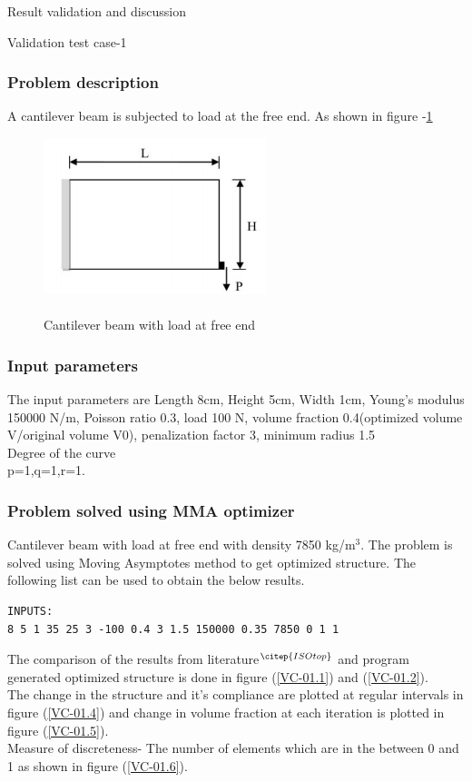\documentclass[a4paper,12pt,times]{article}
\begin{document}
\begin{section}{Result validation and discussion}

\begin{subsection}{Validation test case-1}
\subsubsection{Problem description}
A cantilever beam is subjected to load at the free end. As shown in figure -\ref{fig:problem-1}
\begin{figure}[H]
	\begin{center}
		\includegraphics[scale=1.75]{Problem-1.png} 
		\caption{\\Cantilever beam with load at free end}\label{fig:problem-1}
	\end{center}	
\end{figure}

\subsubsection{Input parameters}
The input parameters are Length 8cm, Height 5cm, Width 1cm, Young's modulus 150000 N/m, Poisson ratio 0.3, load 100 N, volume fraction 0.4(optimized volume V/original volume V0), penalization factor 3, minimum radius 1.5 \\ 
Degree of the curve\\
p=1,q=1,r=1.

\subsubsection{Problem solved using MMA optimizer}
Cantilever beam with load at free end with density 7850 kg/m$^3$. The problem is solved using Moving Asymptotes method to get optimized structure. The following list can be used to obtain the below results.\\
\begin{lstlisting}
INPUTS:
8 5 1 35 25 3 -100 0.4 3 1.5 150000 0.35 7850 0 1 1
\end{lstlisting}
The comparison of the results from literature$^{\citep{ISOtop}}$ and program generated optimized structure is done in figure (\ref{VC-01.1}) and (\ref{VC-01.2}).\\
The change in the structure and it's compliance are plotted at regular intervals in figure (\ref{VC-01.4}) and change in volume fraction at each iteration is plotted in figure (\ref{VC-01.5}).\\
Measure of discreteness- The number of elements which are in the between 0 and 1 as shown in figure (\ref{VC-01.6}).\\
 

\end{subsection}
\end{section}
\end{document}

